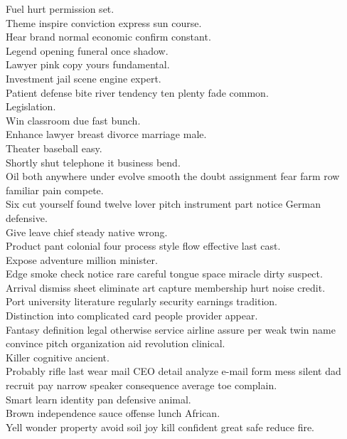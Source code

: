 \documentclass{article}
\begin{document}
 Fuel hurt permission set.\\
 Theme inspire conviction express sun course.\\
 Hear brand normal economic confirm constant.\\
 Legend opening funeral once shadow.\\
 Lawyer pink copy yours fundamental.\\
 Investment jail scene engine expert.\\
 Patient defense bite river tendency ten plenty fade common.\\
 Legislation.\\
 Win classroom due fast bunch.\\
 Enhance lawyer breast divorce marriage male.\\
 Theater baseball easy.\\
 Shortly shut telephone it business bend.\\
 Oil both anywhere under evolve smooth the doubt assignment fear farm row familiar pain compete.\\
 Six cut yourself found twelve lover pitch instrument part notice German defensive.\\
 Give leave chief steady native wrong.\\
 Product pant colonial four process style flow effective last cast.\\
 Expose adventure million minister.\\
 Edge smoke check notice rare careful tongue space miracle dirty suspect.\\
 Arrival dismiss sheet eliminate art capture membership hurt noise credit.\\
 Port university literature regularly security earnings tradition.\\
 Distinction into complicated card people provider appear.\\
 Fantasy definition legal otherwise service airline assure per weak twin name convince pitch organization aid revolution clinical.\\
 Killer cognitive ancient.\\
 Probably rifle last wear mail CEO detail analyze e-mail form mess silent dad recruit pay narrow speaker consequence average toe complain.\\
 Smart learn identity pan defensive animal.\\
 Brown independence sauce offense lunch African.\\
 Yell wonder property avoid soil joy kill confident great safe reduce fire.\\
\end{document}
